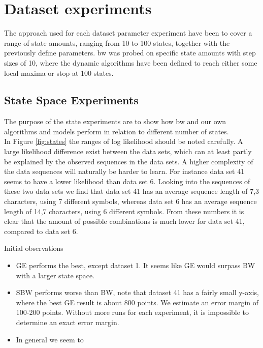 \section{Dataset experiments}
\label{sec:dataset_experiments}
The approach used for each dataset parameter experiment have been to cover a range of state amounts, ranging from 10 to 100 states, together with the previously define parameters. \gls{bw} was probed on specific state amounts with step sizes of 10, where the dynamic algorithms have been defined to reach either some local maxima or stop at 100 states.

\subsection{State Space Experiments}

The purpose of the state experiments are to show how \gls{bw} and our own algorithms and models perform in relation to different number of states.\\

	

In Figure \ref{fig:states} the ranges of log likelihood should be noted carefully. A large likelihood difference exist between the data sets, which can at least partly be explained by the observed sequences in the data sets. A higher complexity of the data sequences will naturally be harder to learn. For instance data set 41 seems to have a lower likelihood than data set 6. Looking into the sequences of these two data sets we find that data set 41 has an average sequence length of 7,3 characters, using 7 different symbols, whereas data set 6 has an average sequence length of 14,7 characters, using 6 different symbols. From these numbers it is clear that the amount of possible combinations is much lower for data set 41, compared to data set 6.




Initial observations
\begin{itemize}
\item GE performs the best, except dataset 1. It seems like GE would surpass BW with a larger state space.
\item SBW performs worse than BW, note that dataset 41 has a fairly small y-axis, where the best GE result is about 800 points. We estimate an error margin of 100-200 points. Without more runs for each experiment, it is impossible to determine an exact error margin.
\item In general we seem to 
\end{itemize}


